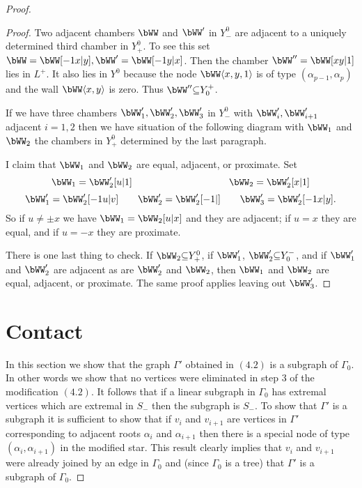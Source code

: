\documentclass{memo-l}
\theoremstyle{definition}
\theoremstyle{remark}
\numberwithin{section}{chapter}
\numberwithin{equation}{chapter}
\begin{document}
\begin{proof}
\begin{proof}
   Two adjacent chambers $\bWW$ and $\bWW'$ in $Y_{-}^{0}$ are
adjacent to a uniquely determined third chamber in $Y_{+}^{0}$.  To see
this set $\bWW = \bWW[-1x\vert y], \bWW' = \bWW[-1y\vert x]$.
Then the chamber $\bWW'' = \bWW[xy\vert 1]$ lies in $L^{+}$.  It also
lies in $Y^{0}$ because the node $\bWW \langle x,y,1\rangle $ is of type
$({\alpha}_{p-1},{\alpha}_{p})$ and the wall $\bWW \langle x,y\rangle $ is zero.  Thus
$\bWW'' {\subseteq} Y_{0}^{+}$.

\medskip
\medskip

   If we have three chambers $\bWW _{1}', 
\bWW _{2}', \bWW _{3}'$ in
$Y^{0}_{-}$ with $\bWW _{i}', 
\bWW '_{i+1}$ adjacent $i=1,2$ then we
have situation of the following diagram with $\bWW _{1}$ and 
$\bWW_{2}$
the chambers in $Y_{+}^{0}$ determined by the last paragraph.

\medskip
\medskip

   I claim that $\bWW_{1}$ and $\bWW_{2}$ 
are equal, adjacent, or
proximate.  Set 
$$
\bWW_{1} = \bWW_{2}'[u\vert 1] 
\qquad \qquad \qquad \qquad \qquad
\bWW_{2} = \bWW_{2}'[x\vert 1]
$$
$$
\bWW_{1}' = \bWW_{2}'[-1u\vert v] \qquad
\bWW_{2}' = \bWW_{2}'[-1\vert ] \qquad
\bWW_{3}' = \bWW_{2}'[-1x\vert y] .
$$ 
So if $u\ne {\pm}x$ we have $\bWW_{1} = 
\bWW_{2}[u\vert x]$ and they are
adjacent; if $u = x$ they are equal, and if $u = - x$ they are proximate.


   There is one last thing to check.  If $\bWW_{2}{\subseteq} Y_{+}^{0}$,
if $\bWW_{1}'$, $\bWW_{2}'{\subseteq}Y_{0}^{-}$, and if $\bWW_{1}'$
and $\bWW_{2}'$ are adjacent as are $\bWW_{2}'$ and $\bWW_{2}$, then
$\bWW_{1}$ and $\bWW_{2}$ are equal, adjacent, or proximate.  The same
proof applies leaving out $\bWW_{3}'$.
\end{proof} 

\section{{Contact}}

   In this section we show that the graph ${\Gamma}'$ obtained in $(4.2)$
is a subgraph of ${\Gamma}_{0}$.  In other words we show that no vertices
were eliminated in step $3$ of the modification $(4.2)$.  It follows that
if a linear subgraph in ${\Gamma}_{0}$ has extremal vertices which are
extremal in $S_{-}$ then the subgraph is $S_{-}$.  To show that ${\Gamma}'$
is a subgraph it is sufficient to show that if $v_{i}$ and $v_{i+1}$ are
vertices in ${\Gamma}'$ corresponding to adjacent roots ${\alpha}_{i}$ and
${\alpha}_{i+1}$ then there is a special node of type
$({\alpha}_{i},{\alpha}_{i+1})$ in the modified star.  This result clearly
implies that $v_{i}$ and $v_{i+1}$ were already joined by an edge in
${\Gamma}_{0}$ and (since ${\Gamma}_{0}$ is a tree) that ${\Gamma}'$ is a
subgraph of ${\Gamma}_{0}$.


\end{proof}
\end{document}
